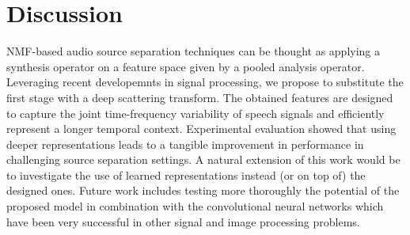 \section{Discussion}
NMF-based audio source separation techniques can be thought as applying a synthesis operator on a feature space
given by a pooled analysis operator. Leveraging recent developemnts in signal processing, we propose to substitute
the first stage with a deep scattering transform. 
The obtained features are designed to capture the joint time-frequency variability of speech signals
and efficiently represent a longer temporal context. Experimental evaluation showed that using deeper representations
leads to a tangible improvement in performance in challenging source separation settings.
A natural extension of this work would be to investigate the use of learned representations instead (or on top of)
the designed ones.
%
Future work includes testing more thoroughly the potential of the proposed model in combination
with the convolutional neural networks which have been very successful in other signal and image processing problems.

